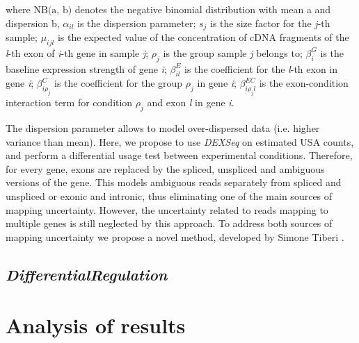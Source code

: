 where $\text{NB(a, b)}$ denotes the negative binomial distribution with mean a and dispersion b, $\alpha_{il}$ is the dispersion parameter; $s_j$ is the size factor for the \emph{j}-th sample; $\mu_{ijl}$ is the expected value of the concentration of cDNA fragments of the \emph{l}-th exon of \emph{i}-th gene in sample \emph{j}; $\rho_j$ is the group sample \emph{j} belongs to; $\beta^G_i$ is the baseline expression strength of gene \emph{i}; $\beta^E_{il}$ is the coefficient for the \emph{l}-th exon in gene \emph{i}; $\beta^C_{i\rho_j}$ is the coefficient for the group $\rho_j$ in gene \emph{i}; $\beta^{EC}_{i \rho_j l}$ is the exon-condition interaction term for condition $\rho_j$ and exon \emph{l} in gene \emph{i}.

The dispersion parameter allows to model over-dispersed data (i.e. higher variance than mean). Here, we propose to use \emph{DEXSeq} on estimated USA counts, and perform a differential usage test between experimental conditions. Therefore, for every gene, exons are replaced by the spliced, unspliced and ambiguous versions of the gene. This models ambiguous reads separately from spliced and unspliced or exonic and intronic, thus eliminating one of the main sources of mapping uncertainty. However, the uncertainty related to reads mapping to multiple genes is still neglected by this approach. To address both sources of mapping uncertainty we propose a novel method, developed by Simone Tiberi \citep{differential_regulation}.

\subsection{\emph{DifferentialRegulation}}

\section{Analysis of results}
